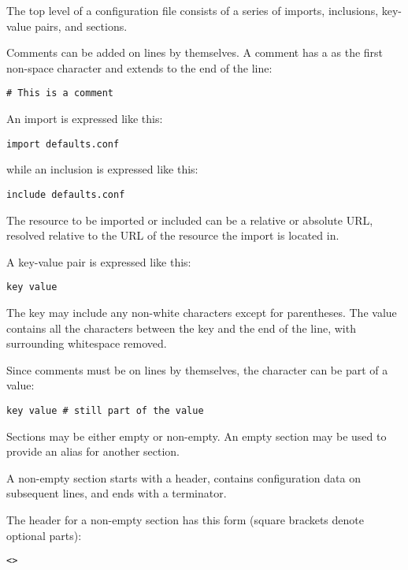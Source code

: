 \documentclass{howto}
\begin{document}
The top level of a configuration file consists of a series of imports,
inclusions, key-value pairs, and sections.

Comments can be added on lines by themselves.  A comment has a
\character{\#} as the first non-space character and extends to the end
of the line:

\begin{verbatim}
# This is a comment
\end{verbatim}

An import is expressed like this:

\begin{verbatim}
import defaults.conf
\end{verbatim}

while an inclusion is expressed like this:

\begin{verbatim}
include defaults.conf
\end{verbatim}

The resource to be imported or included can be a relative or absolute
URL, resolved relative to the URL of the resource the import is
located in.


A key-value pair is expressed like this:

\begin{verbatim}
key value
\end{verbatim}

The key may include any non-white characters except for parentheses.
The value contains all the characters between the key and the end of
the line, with surrounding whitespace removed.

Since comments must be on lines by themselves, the \character{\#}
character can be part of a value:

\begin{verbatim}
key value # still part of the value
\end{verbatim}

Sections may be either empty or non-empty.  An empty section may be
used to provide an alias for another section.

A non-empty section starts with a header, contains configuration
data on subsequent lines, and ends with a terminator.

The header for a non-empty section has this form (square brackets
denote optional parts):

\begin{alltt}
<   >
\end{alltt}
\end{document}
